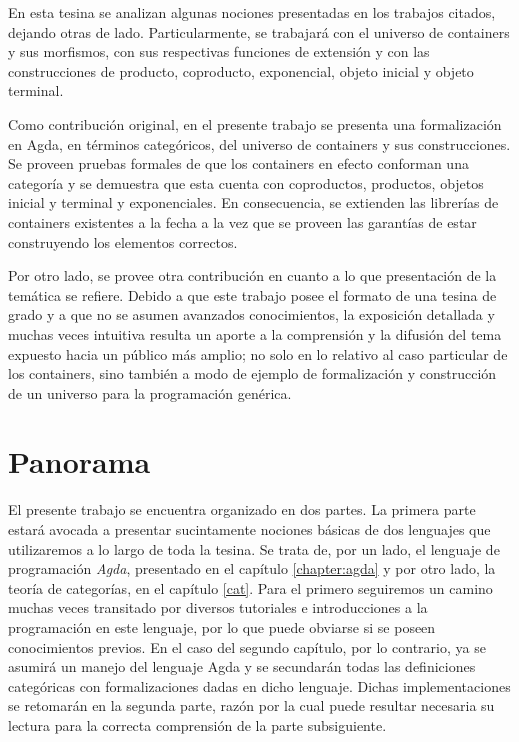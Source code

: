 En esta tesina se analizan algunas nociones presentadas en los trabajos citados, dejando otras de lado. Particularmente, se trabajará con el universo de containers y sus morfismos, con sus respectivas funciones de extensión y con las construcciones de producto, coproducto, exponencial, objeto inicial y objeto terminal. 

Como contribución original, en el presente trabajo se presenta una formalización en Agda, en términos categóricos, del universo de containers y sus construcciones. Se proveen pruebas formales de que los containers en efecto conforman una categoría y se demuestra que esta cuenta con coproductos, productos, objetos inicial y terminal y exponenciales. En consecuencia, se extienden las librerías de containers existentes a la fecha a la vez que se proveen las garantías de estar construyendo los elementos correctos.

Por otro lado, se provee otra contribución en cuanto a lo que presentación de la temática se refiere. Debido a que este trabajo posee el formato de una tesina de grado y a que no se asumen avanzados conocimientos, la exposición detallada y muchas veces intuitiva resulta un aporte a la comprensión y la difusión del tema expuesto hacia un público más amplio; no solo en lo relativo al caso particular de los containers, sino también a modo de ejemplo de formalización y construcción de un universo para la programación genérica.


\section*{Panorama}

El presente trabajo se encuentra organizado en dos partes.
La primera parte estará avocada a presentar sucintamente nociones básicas de dos lenguajes que utilizaremos a lo largo de toda la tesina. Se trata de, por un lado, el lenguaje de programación {\it Agda}, presentado en el capítulo \ref{chapter:agda} y por otro lado, la teoría de categorías, en el capítulo \ref{cat}. Para el primero seguiremos un camino muchas veces transitado por diversos tutoriales e introducciones a la programación en este lenguaje, por lo que puede obviarse si se poseen conocimientos previos. En el caso del segundo capítulo, por lo contrario, ya se asumirá un manejo del lenguaje Agda y se secundarán todas las definiciones categóricas con formalizaciones dadas en dicho lenguaje. Dichas implementaciones se retomarán en la segunda parte, razón por la cual puede resultar necesaria su lectura para la correcta comprensión de la parte subsiguiente.

